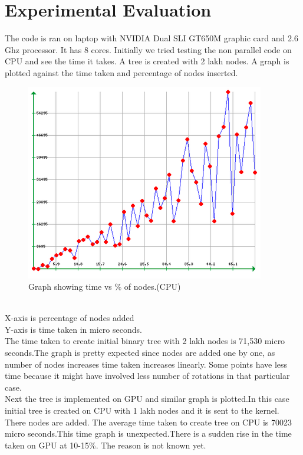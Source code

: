 \documentclass[BTech]{iitmdiss}
\begin{document}
\chapter{Experimental Evaluation}

The code is ran on laptop with NVIDIA Dual SLI GT650M graphic card and 2.6 Ghz processor. It has 8 cores.
Initially we tried testing the non parallel code on CPU and see the time it takes. A tree is created with 2 lakh nodes. A graph is plotted against the time taken and percentage of nodes inserted.\\
\begin{figure}[h]
    \centering
    \includegraphics{rsz_graph_seed3.png}
    \caption{Graph showing time vs \% of nodes.(CPU)}
    \label{fig:graph_cpu}
\end{figure}\\
X-axis is percentage of nodes added\\
Y-axis is time taken in micro seconds.\\
The time taken to create initial binary tree with 2 lakh nodes is 71,530 micro seconds.The graph is pretty expected since nodes are added one by one, as number of nodes increases time taken increases linearly. Some points have less time because it might have involved less number of rotations in that particular case.\\
Next the tree is implemented on GPU and similar graph is plotted.In this case initial tree is created on CPU with 1 lakh nodes and it is sent to the kernel. There nodes are added. The average time taken to create tree on CPU is 70023 micro seconds.This time graph is unexpected.There is a sudden rise in the time taken on GPU at 10-15\%. The reason is not known yet.\\
\end{document}
